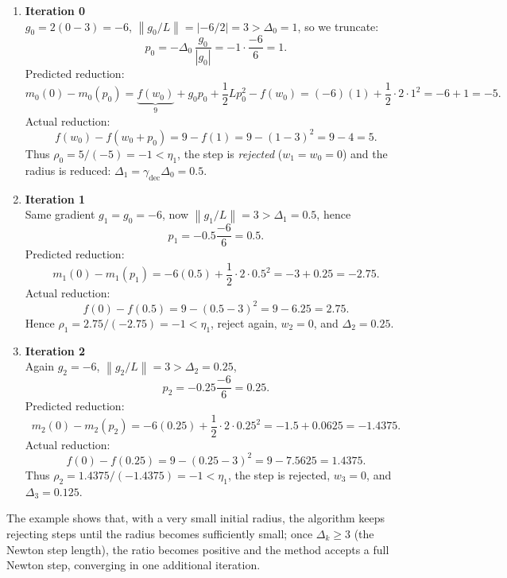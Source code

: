 \documentclass[11pt]{article}
\newcommand{\norm}[1]{\left\lVert #1\right\rVert}
\begin{document}
\begin{enumerate}[label=Iteration \arabic*:, leftmargin=*]
\item \textbf{Iteration 0}\\
$g_{0}=2(0-3)=-6$, $\norm{g_{0}/L}=|{-6}/2|=3>\Delta_{0}=1$, so we truncate:
\[
p_{0}= -\Delta_{0}\,\frac{g_{0}}{|g_{0}|}= -1\cdot\frac{-6}{6}=1 .
\]
Predicted reduction:
\[
m_{0}(0)-m_{0}(p_{0})=
\underbrace{f(w_{0})}_{9}
+g_{0}p_{0}+\frac12 L p_{0}^{2}
- f(w_{0})
= (-6)(1)+\frac12\cdot2\cdot1^{2}= -6+1=-5 .
\]
Actual reduction:
\[
f(w_{0})-f(w_{0}+p_{0})=9- f(1)=9-(1-3)^{2}=9-4=5 .
\]
Thus $\rho_{0}=5/(-5)=-1<\eta_{1}$, the step is \emph{rejected}
($w_{1}=w_{0}=0$) and the radius is reduced:
$\Delta_{1}= \gamma_{\text{dec}}\Delta_{0}=0.5$.

\item \textbf{Iteration 1}\\
Same gradient $g_{1}=g_{0}=-6$, now $\norm{g_{1}/L}=3>\Delta_{1}=0.5$,
hence
\[
p_{1}= -0.5\frac{-6}{6}=0.5 .
\]
Predicted reduction:
\[
m_{1}(0)-m_{1}(p_{1})= -6(0.5)+\frac12\cdot2\cdot0.5^{2}= -3+0.25=-2.75 .
\]
Actual reduction:
\[
f(0)-f(0.5)=9-(0.5-3)^{2}=9-6.25=2.75 .
\]
Hence $\rho_{1}=2.75/(-2.75)=-1<\eta_{1}$, reject again,
$w_{2}=0$, and $\Delta_{2}=0.25$.

\item \textbf{Iteration 2}\\
Again $g_{2}=-6$, $\norm{g_{2}/L}=3>\Delta_{2}=0.25$,
\[
p_{2}= -0.25\frac{-6}{6}=0.25 .
\]
Predicted reduction:
\[
m_{2}(0)-m_{2}(p_{2})= -6(0.25)+\frac12\cdot2\cdot0.25^{2}= -1.5+0.0625=-1.4375 .
\]
Actual reduction:
\[
f(0)-f(0.25)=9-(0.25-3)^{2}=9-7.5625=1.4375 .
\]
Thus $\rho_{2}=1.4375/(-1.4375)=-1<\eta_{1}$,
the step is rejected, $w_{3}=0$, and $\Delta_{3}=0.125$.

\end{enumerate}
The example shows that, with a very small initial radius, the algorithm
keeps rejecting steps until the radius becomes sufficiently small; once
$\Delta_{k}\ge 3$ (the Newton step length), the ratio becomes positive and
the method accepts a full Newton step, converging in one additional
iteration. 

\newpage
\end{document}
